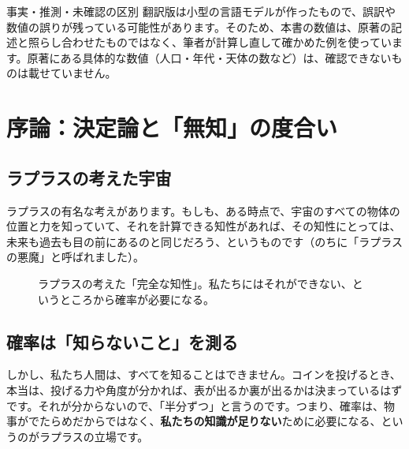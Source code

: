\documentclass[a4paper,11pt,openany]{ltjsbook}
\begin{document}
\begin{notebox}{事実・推測・未確認の区別}
翻訳版は小型の言語モデルが作ったもので、誤訳や数値の誤りが残っている可能性があります。そのため、本書の数値は、原著の記述と照らし合わせたものではなく、筆者が計算し直して確かめた例を使っています。原著にある具体的な数値（人口・年代・天体の数など）は、確認できないものは載せていません。
\end{notebox}

\chapter{序論：決定論と「無知」の度合い}

\section{ラプラスの考えた宇宙}

ラプラスの有名な考えがあります。もしも、ある時点で、宇宙のすべての物体の位置と力を知っていて、それを計算できる知性があれば、その知性にとっては、未来も過去も目の前にあるのと同じだろう、というものです（のちに「ラプラスの悪魔」と呼ばれました）。

\begin{figure}[htbp]
\centering
{}
\caption{ラプラスの考えた「完全な知性」。私たちにはそれができない、というところから確率が必要になる。}
\end{figure}

\section{確率は「知らないこと」を測る}

しかし、私たち人間は、すべてを知ることはできません。コインを投げるとき、本当は、投げる力や角度が分かれば、表が出るか裏が出るかは決まっているはずです。それが分からないので、「半分ずつ」と言うのです。つまり、確率は、物事がでたらめだからではなく、\textbf{私たちの知識が足りない}ために必要になる、というのがラプラスの立場です。
\end{document}
